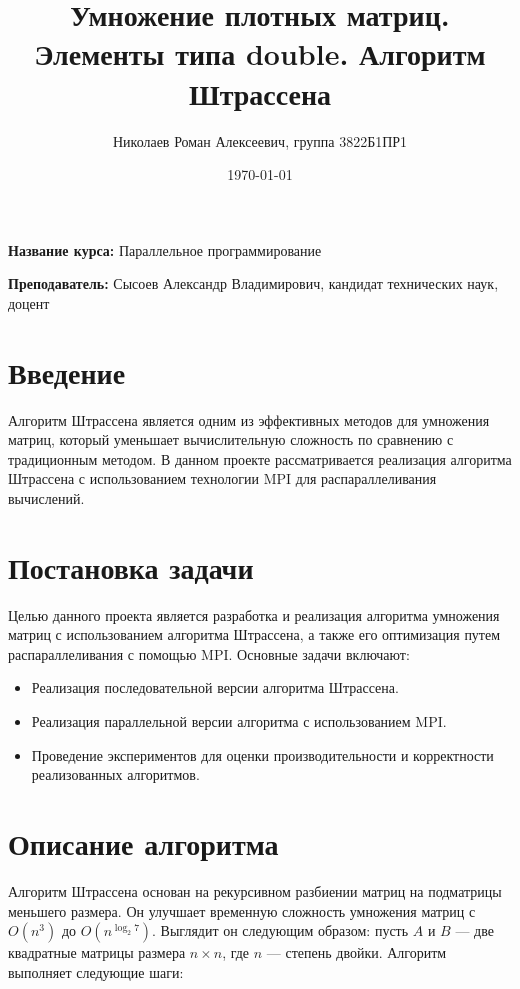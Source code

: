 \documentclass[a4paper,12pt]{article}
\title{Умножение плотных матриц. Элементы типа double. Алгоритм Штрассена}
\author{Николаев Роман Алексеевич, группа 3822Б1ПР1}
\date{\today}
\begin{document}
\maketitle

\begin{center}
  \textbf{Название курса:} Параллельное программирование
\end{center}

\begin{center}
    \textbf{Преподаватель:} Сысоев Александр Владимирович, кандидат технических наук, доцент
\end{center}

\vspace{1cm}

\section{Введение}
Алгоритм Штрассена является одним из эффективных методов для умножения матриц, который уменьшает вычислительную сложность по сравнению с традиционным методом. В данном проекте рассматривается реализация алгоритма Штрассена с использованием технологии MPI для распараллеливания вычислений.

\section{Постановка задачи}
Целью данного проекта является разработка и реализация алгоритма умножения матриц с использованием алгоритма Штрассена, а также его оптимизация путем распараллеливания с помощью MPI. Основные задачи включают:
\begin{itemize}
    \item Реализация последовательной версии алгоритма Штрассена.
    \item Реализация параллельной версии алгоритма с использованием MPI.
    \item Проведение экспериментов для оценки производительности и корректности реализованных алгоритмов.
\end{itemize}

\section{Описание алгоритма}
Алгоритм Штрассена основан на рекурсивном разбиении матриц на подматрицы меньшего размера. Он улучшает временную сложность умножения матриц с $O(n^3)$ до $O(n^{\log_2 7})$. Выглядит он следующим образом: пусть $A$ и $B$ — две квадратные матрицы размера $n \times n$, где $n$ — степень двойки. Алгоритм выполняет следующие шаги:
\end{document}
